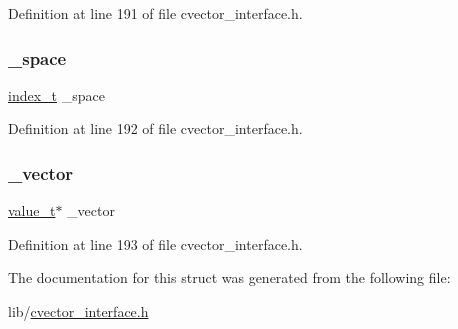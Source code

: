 Definition at line 191 of file cvector\+\_\+interface.\+h.

\mbox{\label{structcvector_a5948a8ef12921a8fc535fbcb48d4d4d4}} 
\subsubsection{\texorpdfstring{\+\_\+space}{\_space}}
{\footnotesize\ttfamily \hyperlink{cvector__interface_8h_ad722078677c063a09661059674fb996c}{index\+\_\+t} \+\_\+space}



Definition at line 192 of file cvector\+\_\+interface.\+h.

\mbox{\label{structcvector_ae60afc8a80c3a6c945520216265ebbe0}} 
\subsubsection{\texorpdfstring{\+\_\+vector}{\_vector}}
{\footnotesize\ttfamily \hyperlink{cvector__interface_8h_a693b7d81758e9116dfebbbff0daa099b}{value\+\_\+t}$\ast$ \+\_\+vector}



Definition at line 193 of file cvector\+\_\+interface.\+h.



The documentation for this struct was generated from the following file\+:\begin{DoxyCompactItemize}
\item 
lib/\hyperlink{cvector__interface_8h}{cvector\+\_\+interface.\+h}\end{DoxyCompactItemize}

